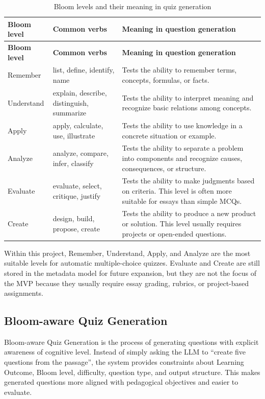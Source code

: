 \begin{longtable}{|p{2.6cm}|p{4.2cm}|p{7cm}|}
\caption{Bloom levels and their meaning in quiz generation}
\label{tab:bloom-levels}\\
\hline
\textbf{Bloom level} & \textbf{Common verbs} & \textbf{Meaning in question generation} \\
\hline
\endfirsthead
\hline
\textbf{Bloom level} & \textbf{Common verbs} & \textbf{Meaning in question generation} \\
\hline
\endhead
Remember & list, define, identify, name & Tests the ability to remember terms, concepts, formulas, or facts. \\
\hline
Understand & explain, describe, distinguish, summarize & Tests the ability to interpret meaning and recognize basic relations among concepts. \\
\hline
Apply & apply, calculate, use, illustrate & Tests the ability to use knowledge in a concrete situation or example. \\
\hline
Analyze & analyze, compare, infer, classify & Tests the ability to separate a problem into components and recognize causes, consequences, or structure. \\
\hline
Evaluate & evaluate, select, critique, justify & Tests the ability to make judgments based on criteria. This level is often more suitable for essays than simple MCQs. \\
\hline
Create & design, build, propose, create & Tests the ability to produce a new product or solution. This level usually requires projects or open-ended questions. \\
\hline
\end{longtable}

Within this project, Remember, Understand, Apply, and Analyze are the most
suitable levels for automatic multiple-choice quizzes. Evaluate and
Create are still stored in the metadata model for future expansion, but
they are not the focus of the MVP because they usually require essay
grading, rubrics, or project-based assignments.

\subsection{Bloom-aware Quiz Generation}
\label{subsec:bloom-aware-quiz-generation}

Bloom-aware Quiz Generation is the process of generating questions with
explicit awareness of cognitive level. Instead of simply asking the LLM
to ``create five questions from the passage'', the system provides
constraints about Learning Outcome, Bloom level, difficulty, question
type, and output structure. This makes generated questions more aligned
with pedagogical objectives and easier to evaluate.

